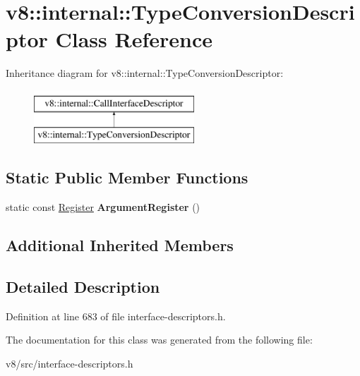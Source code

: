 \hypertarget{classv8_1_1internal_1_1TypeConversionDescriptor}{}\section{v8\+:\+:internal\+:\+:Type\+Conversion\+Descriptor Class Reference}
\label{classv8_1_1internal_1_1TypeConversionDescriptor}
Inheritance diagram for v8\+:\+:internal\+:\+:Type\+Conversion\+Descriptor\+:\begin{figure}[H]
\begin{center}
\leavevmode
\includegraphics[height=2.000000cm]{classv8_1_1internal_1_1TypeConversionDescriptor}
\end{center}
\end{figure}
\subsection*{Static Public Member Functions}
\begin{DoxyCompactItemize}
\item 
\mbox{\label{classv8_1_1internal_1_1TypeConversionDescriptor_ae829b79a7bf57fad4bb6d1aadb709a83}} 
static const \mbox{\hyperlink{classv8_1_1internal_1_1Register}{Register}} {\bfseries Argument\+Register} ()
\end{DoxyCompactItemize}
\subsection*{Additional Inherited Members}


\subsection{Detailed Description}


Definition at line 683 of file interface-\/descriptors.\+h.



The documentation for this class was generated from the following file\+:\begin{DoxyCompactItemize}
\item 
v8/src/interface-\/descriptors.\+h\end{DoxyCompactItemize}
